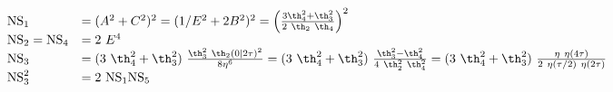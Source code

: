 \begin{equation}
  \begin{array}{ll}
{\rm NS}_1 &= (A^2 +C^2)^2 = (1/E^2 + 2B^2)^2 = \left( {3\th_4^2
  +\th_3^2  \over 2~\th_2 ~\th_4} \right)^2 \\
{\rm NS}_2 = {\rm NS}_4 &= 2 ~E^4 \\
{\rm NS}_3 &= (3~\th_4^2 +\th_3^2) ~{\th_3^2 ~\th_2(0|2\tau)^2
  \over 8 \eta^6} = (3~\th_4^2 +\th_3^2) ~{\th_3^2 -\th_4^2
  \over 4~\th_2^2~\th_4^2} =  (3~\th_4^2 +\th_3^2)~ {\eta
  ~\eta(4\tau) \over  2~\eta(\tau/2) ~\eta(2\tau)}\\ 
{\rm NS}_3^2 &= 2 ~{\rm NS}_1 {\rm NS}_5
  \end{array}
\end{equation}

